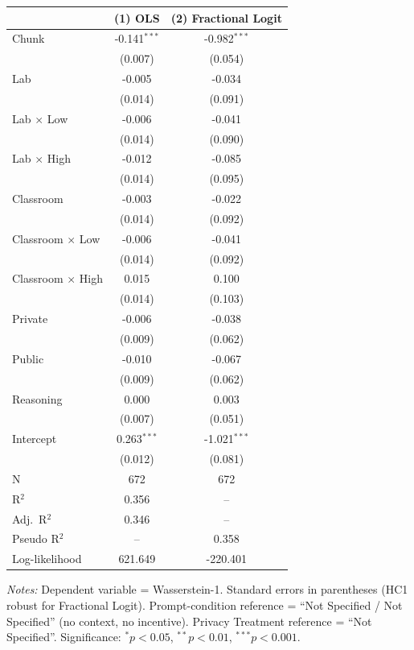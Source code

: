 \normalsize
\setlength{\tabcolsep}{3pt}
\begin{tabular}{lcc}
\toprule
 & (1) OLS & (2) Fractional Logit \\
\midrule
Chunk & -0.141$^{***}$ & -0.982$^{***}$ \\
 & (0.007) & (0.054) \\
Lab & -0.005 & -0.034 \\
 & (0.014) & (0.091) \\
Lab $\times$ Low & -0.006 & -0.041 \\
 & (0.014) & (0.090) \\
Lab $\times$ High & -0.012 & -0.085 \\
 & (0.014) & (0.095) \\
Classroom & -0.003 & -0.022 \\
 & (0.014) & (0.092) \\
Classroom $\times$ Low & -0.006 & -0.041 \\
 & (0.014) & (0.092) \\
Classroom $\times$ High & 0.015 & 0.100 \\
 & (0.014) & (0.103) \\
Private & -0.006 & -0.038 \\
 & (0.009) & (0.062) \\
Public & -0.010 & -0.067 \\
 & (0.009) & (0.062) \\
Reasoning & 0.000 & 0.003 \\
 & (0.007) & (0.051) \\
Intercept & 0.263$^{***}$ & -1.021$^{***}$ \\
 & (0.012) & (0.081) \\
\midrule N & 672 & 672 \\
R$^2$ & 0.356 & -- \\
Adj.\ R$^2$ & 0.346 & -- \\
Pseudo R$^2$ & -- & 0.358 \\
Log-likelihood & 621.649 & -220.401 \\
\bottomrule
\end{tabular}

\par\smallskip\footnotesize \textit{Notes:} Dependent variable = Wasserstein-1. Standard errors in parentheses (HC1 robust for Fractional Logit). Prompt-condition reference = ``Not Specified / Not Specified'' (no context, no incentive). Privacy Treatment reference = ``Not Specified''. Significance: $^{*}p<0.05$, $^{**}p<0.01$, $^{***}p<0.001$.
